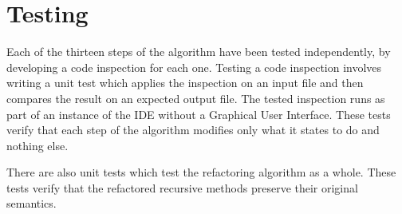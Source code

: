 \chapter{Testing}

Each of the thirteen steps of the algorithm have been tested independently, by developing a code inspection for each
one. Testing a code inspection involves writing a unit test which applies the inspection on an input file and then
compares the result on an expected output file. The tested inspection runs as part of an instance of the IDE without
a Graphical User Interface. These tests verify that each step of the algorithm modifies only what it states to do and
nothing else.

There are also unit tests which test the refactoring algorithm as a whole. These tests verify that the refactored
recursive methods preserve their original semantics.